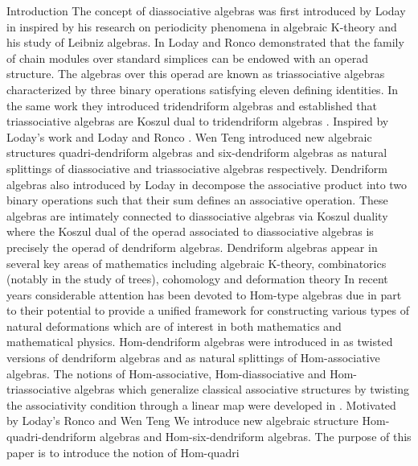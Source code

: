 \documentclass[11pt,twoside,reqno]{amsart}
\makeatletter
\renewcommand{\section}{\@startsection{section}{1}
  \z@{.7\linespacing\@plus\linespacing}{.5\linespacing}
  {\normalfont\upshape\bfseries\centering}}
\theoremstyle{plain}
\theoremstyle{definition}
\makeatother
\begin{document}
\section{Introduction}\label{introduction}
The concept of diassociative algebras was first introduced by Loday in \cite{M2008}  inspired by his research on periodicity phenomena in algebraic K-theory and his study of Leibniz algebras.
In \cite{LR}  Loday and Ronco demonstrated that the family of chain modules over standard simplices can be endowed with an operad structure. The algebras over this operad are known as triassociative algebras  characterized by three binary operations satisfying eleven defining identities. In the same work  they introduced tridendriform algebras and established that triassociative algebras are Koszul dual to tridendriform algebras \cite{E,EMP,ZGM}.
Inspired by Loday’s work \cite{L} and Loday and Ronco \cite{LR}.  Wen Teng \cite{WenTeng} introduced new algebraic structures quadri-dendriform algebras and six-dendriform algebras  as natural splittings of diassociative and triassociative algebras  respectively.
Dendriform algebras  also introduced by Loday in \cite{Basdouri1,MBZ1,Basdouri2,LR,AM}  decompose the associative product into two binary operations such that their sum defines an associative operation. These algebras are intimately connected to diassociative algebras via Koszul duality  where the Koszul dual of the operad associated to diassociative algebras is precisely the operad of dendriform algebras.
Dendriform algebras appear in several key areas of mathematics including algebraic K-theory,  combinatorics (notably in the study of trees), cohomology  and deformation theory
In recent years  considerable attention has been devoted to Hom-type algebras  due in part to their potential to provide a unified framework for constructing various types of natural deformations  which are of interest in both mathematics and mathematical physics.
Hom-dendriform algebras were introduced in \cite{D0, D1, DS, MS,MAZ, Y} as twisted versions of dendriform algebras and as natural splittings of Hom-associative algebras. 
The notions of Hom-associative, Hom-diassociative  and Hom-triassociative algebras  which generalize classical associative structures by twisting the associativity condition through a linear map  were developed in \cite{D1,  MBZ, AZ, ZB, Zahari2025}.
Motivated by Loday’s  Ronco and Wen Teng \cite{L, LR, WenTeng}  We introduce new algebraic structure Hom-quadri-dendriform algebras and Hom-six-dendriform algebras.
 The purpose of this paper is to introduce the notion of Hom-quadri
\end{document}
